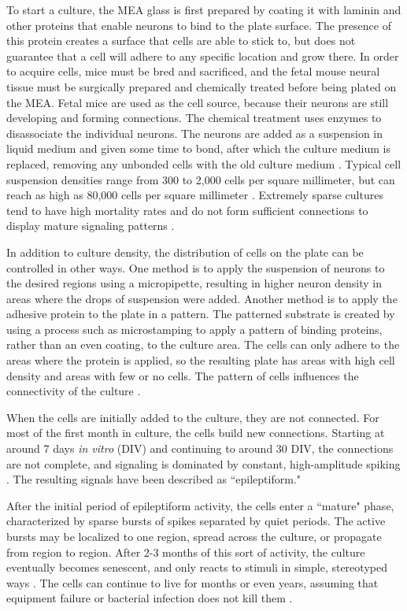 \documentclass[letterpaper]{article}
\begin{document}
To start a culture, the MEA glass is first prepared by coating it with laminin and other proteins that enable neurons to bind to the plate surface. 
The presence of this protein creates a surface that cells are able to stick to, but does not guarantee that a cell will adhere to any specific location and grow there. 
In order to acquire cells, mice must be bred and sacrificed, and the fetal mouse neural tissue must be surgically prepared and chemically treated before being plated on the MEA. 
Fetal mice are used as the cell source, because their neurons are still developing and forming connections. 
The chemical treatment uses enzymes to disassociate the individual neurons. 
The neurons are added as a suspension in liquid medium and given some time to bond, after which the culture medium is replaced, removing any unbonded cells with the old culture medium \cite{wagenaar2006extremely}.
Typical cell suspension densities range from 300 to 2,000 cells per square millimeter, but can reach as high as 80,000 cells per square millimeter \cite{shea2009optimization,ruaro2005toward}.
Extremely sparse cultures tend to have high mortality rates and do not form sufficient connections to display mature signaling patterns \cite{shea2009optimization}.

In addition to culture density, the distribution of cells on the plate can be controlled in other ways. 
One method is to apply the suspension of neurons to the desired regions using a micropipette, resulting in higher neuron density in areas where the drops of suspension were added. 
Another method is to apply the adhesive protein to the plate in a pattern. 
The patterned substrate is created by using a process such as microstamping to apply a pattern of binding proteins, rather than an even coating, to the culture area. 
The cells can only adhere to the areas where the protein is applied, so the resulting plate has areas with high cell density and areas with few or no cells.
The pattern of cells influences the connectivity of the culture \cite{sorkin2006compact}.

When the cells are initially added to the culture, they are not connected. 
For most of the first month in culture, the cells build new connections. 
Starting at around 7 days \emph{in vitro} (DIV) and continuing to around 30 DIV, the connections are not complete, and signaling is dominated by constant, high-amplitude spiking . 
The resulting signals have been described as ``epileptiform."

After the initial period of epileptiform activity, the cells enter a ``mature" phase, characterized by sparse bursts of spikes separated by quiet periods. 
The active bursts may be localized to one region, spread across the culture, or propagate from region to region. 
After 2-3 months of this sort of activity, the culture eventually becomes senescent, and only reacts to stimuli in simple, stereotyped ways \cite{warwick2010controlling}. 
The cells can continue to live for months or even years, assuming that equipment failure or bacterial infection does not kill them \cite{potter2001new}. 
\end{document}

